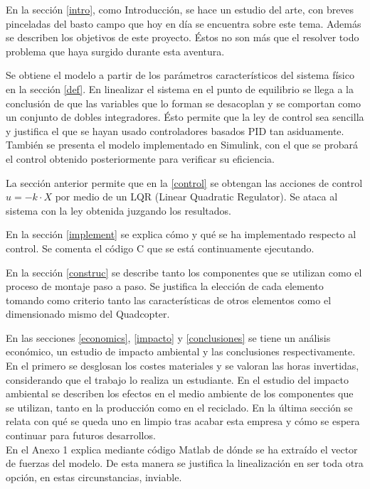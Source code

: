 \documentclass[twoside]{article}
\begin{document}
En la sección \ref{intro}, como Introducción, se hace un estudio del arte, con breves pinceladas del basto campo que hoy en día se encuentra sobre este tema. Además se describen los objetivos de este proyecto. Éstos no son más que el resolver todo problema que haya surgido durante esta aventura.

Se obtiene el modelo a partir de los parámetros característicos del sistema físico en la sección \ref{def}. En linealizar el sistema en el punto de equilibrio se llega a la conclusión de que las variables que lo forman se desacoplan y se comportan como un conjunto de dobles integradores. Ésto permite que la ley de control sea sencilla y justifica el que se hayan usado controladores basados PID tan asiduamente. También se presenta el modelo implementado en Simulink, con el que se probará el control obtenido posteriormente para verificar su eficiencia.

La sección anterior permite que en la \ref{control} se obtengan las acciones de control $u=-k \cdot X$ por medio de un LQR (Linear Quadratic Regulator). Se ataca al sistema con la ley obtenida juzgando los resultados.

En la sección \ref{implement} se explica cómo y qué se ha implementado respecto al control. Se comenta el código C que se está continuamente ejecutando.

En la sección \ref{construc} se describe tanto los componentes que se utilizan como el proceso de montaje paso a paso. Se justifica la elección de cada elemento tomando como criterio tanto las características de otros elementos como el dimensionado mismo del Quadcopter. 

En las secciones \ref{economics}, \ref{impacto} y \ref{conclusiones} se tiene un análisis económico, un estudio de impacto ambiental y las conclusiones respectivamente. En el primero se desglosan los costes materiales y se valoran las horas invertidas, considerando que el trabajo lo realiza un estudiante. En el estudio del impacto ambiental se describen los efectos en el medio ambiente de los componentes que se utilizan, tanto en la producción como en el reciclado. En la última sección se relata con qué se queda uno en limpio tras acabar esta empresa y cómo se espera continuar para futuros desarrollos.\\

En el Anexo 1 explica mediante código Matlab de dónde se ha extraído el vector de fuerzas del modelo. De esta manera se justifica la linealización en ser toda otra opción, en estas circunstancias, inviable.
\end{document}
